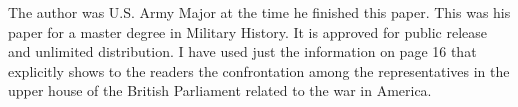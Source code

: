 The author was U.S. Army Major at the time he finished this paper. This was his
paper for a master degree in Military History. It is approved for public
release and unlimited distribution. I have used just the information on page 16
that explicitly shows to the readers the confrontation among the
representatives in the upper house of the British Parliament related to the war
in America.
